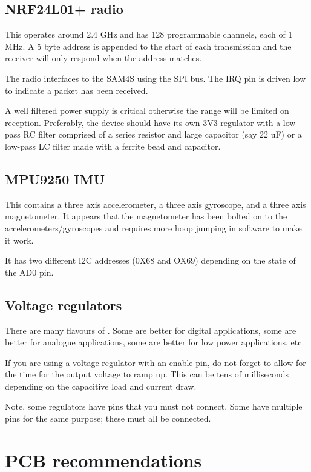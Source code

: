 \subsection{NRF24L01+ radio}\label{nrf24l01-radio}

This operates around 2.4 GHz and has 128 programmable channels, each of
1 MHz. A 5 byte address is appended to the start of each transmission
and the receiver will only respond when the address matches.

The radio interfaces to the SAM4S using the SPI bus. The IRQ
pin is driven low to indicate a packet has been received.

A well filtered power supply is critical otherwise the range will be
limited on reception. Preferably, the device should have its own 3V3
regulator with a low-pass RC filter comprised of a series resistor and
large capacitor (say 22 uF) or a low-pass LC filter made with a ferrite
bead and capacitor.

\subsection{MPU9250 IMU}\label{mpu9250-imu}

This contains a three axis accelerometer, a three axis gyroscope, and a
three axis magnetometer. It appears that the magnetometer has been
bolted on to the accelerometers/gyroscopes and requires more hoop
jumping in software to make it work.

It has two different I2C addresses (0X68 and OX69) depending on
the state of the AD0 pin.


\subsection{Voltage regulators}\label{voltage-regulators}

There are many flavours of .
Some are better for digital applications, some are better for analogue
applications, some are better for low power applications, etc.

If you are using a voltage regulator with an enable pin, do not forget
to allow for the time for the output voltage to ramp up. This can be
tens of milliseconds depending on the capacitive load and current draw.

Note, some regulators have pins that you must not connect. Some have
multiple pins for the same purpose; these must all be connected.

\section{PCB recommendations}\label{pcb-recommendations}

